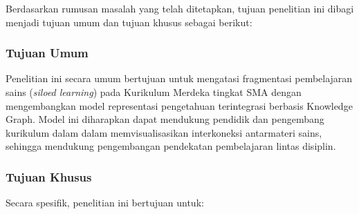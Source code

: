 \documentclass[
]{article}
\begin{document}
Berdasarkan rumusan masalah yang telah ditetapkan, tujuan penelitian ini
dibagi menjadi tujuan umum dan tujuan khusus sebagai berikut:

\hypertarget{tujuan-umum}{%
\subsubsection{Tujuan Umum}\label{tujuan-umum}}

Penelitian ini secara umum bertujuan untuk mengatasi fragmentasi
pembelajaran sains (\emph{siloed learning}) pada Kurikulum Merdeka
tingkat SMA dengan mengembangkan model representasi pengetahuan
terintegrasi berbasis Knowledge Graph. Model ini diharapkan dapat
mendukung pendidik dan pengembang kurikulum dalam dalam
memvisualisasikan interkoneksi antarmateri sains, sehingga mendukung
pengembangan pendekatan pembelajaran lintas disiplin.

\hypertarget{tujuan-khusus}{%
\subsubsection{Tujuan Khusus}\label{tujuan-khusus}}

Secara spesifik, penelitian ini bertujuan untuk:
\end{document}
